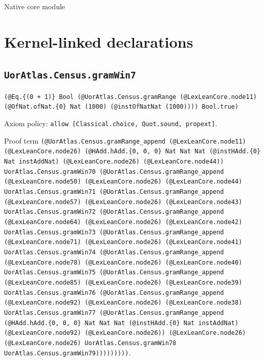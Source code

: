 \documentclass[11pt]{article}
\begin{document}
\begin{center}{\LARGE Native core module}\end{center}
\section*{Kernel-linked declarations}
\subsection*{\texttt{UorAtlas.Census.gramWin7}}
\noindent\texttt{(@Eq.\{(0 + 1)\} Bool (@UorAtlas.Census.gramRange (@LexLeanCore.node11) (@OfNat.ofNat.\{0\} Nat (1000) (@instOfNatNat (1000)))) Bool.true)}\par
\noindent Axiom policy: \texttt{allow [Classical.choice, Quot.sound, propext]}.\par
\noindent Proof term \texttt{(@UorAtlas.Census.gramRange\_append (@LexLeanCore.node11) (@LexLeanCore.node26) (@HAdd.hAdd.\{0, 0, 0\} Nat Nat Nat (@instHAdd.\{0\} Nat instAddNat) (@LexLeanCore.node26) (@LexLeanCore.node44)) UorAtlas.Census.gramWin70 (@UorAtlas.Census.gramRange\_append (@LexLeanCore.node50) (@LexLeanCore.node26) (@LexLeanCore.node44) UorAtlas.Census.gramWin71 (@UorAtlas.Census.gramRange\_append (@LexLeanCore.node57) (@LexLeanCore.node26) (@LexLeanCore.node43) UorAtlas.Census.gramWin72 (@UorAtlas.Census.gramRange\_append (@LexLeanCore.node64) (@LexLeanCore.node26) (@LexLeanCore.node42) UorAtlas.Census.gramWin73 (@UorAtlas.Census.gramRange\_append (@LexLeanCore.node71) (@LexLeanCore.node26) (@LexLeanCore.node41) UorAtlas.Census.gramWin74 (@UorAtlas.Census.gramRange\_append (@LexLeanCore.node78) (@LexLeanCore.node26) (@LexLeanCore.node40) UorAtlas.Census.gramWin75 (@UorAtlas.Census.gramRange\_append (@LexLeanCore.node85) (@LexLeanCore.node26) (@LexLeanCore.node39) UorAtlas.Census.gramWin76 (@UorAtlas.Census.gramRange\_append (@LexLeanCore.node92) (@LexLeanCore.node26) (@LexLeanCore.node38) UorAtlas.Census.gramWin77 (@UorAtlas.Census.gramRange\_append (@HAdd.hAdd.\{0, 0, 0\} Nat Nat Nat (@instHAdd.\{0\} Nat instAddNat) (@LexLeanCore.node92) (@LexLeanCore.node26)) (@LexLeanCore.node26) (@LexLeanCore.node26) UorAtlas.Census.gramWin78 UorAtlas.Census.gramWin79)))))))))}.\par
\end{document}
